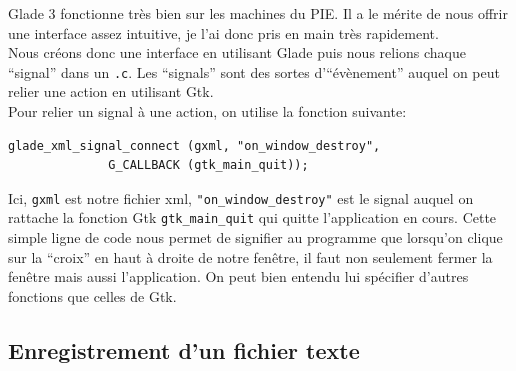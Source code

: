 \documentclass[a4paper,12pt]{report}
\begin{document}
Glade 3 fonctionne tr\`es bien sur les machines du PIE. Il a le m\'erite de nous offrir une interface assez intuitive, je l'ai donc pris en main tr\`es rapidement.\\
Nous cr\'eons donc une interface en utilisant Glade puis nous relions chaque ``signal'' dans un \texttt{.c}. Les ``signals'' sont des sortes d'``\'ev\`enement'' auquel on peut relier une action en utilisant Gtk.\\
Pour relier un signal \`a une action, on utilise la fonction suivante:

\begin{lstlisting}
glade_xml_signal_connect (gxml, "on_window_destroy",
			  G_CALLBACK (gtk_main_quit));
\end{lstlisting}

Ici, \verb!gxml! est notre fichier xml, \verb!"on_window_destroy"! est le signal auquel on rattache la fonction Gtk \verb!gtk_main_quit! qui quitte l'application en cours. Cette simple ligne de code nous permet de signifier au programme que lorsqu'on clique sur la ``croix'' en haut \`a droite de notre fen\^etre, il faut non seulement fermer la fen\^etre mais aussi l'application.
On peut bien entendu lui sp\'ecifier d'autres fonctions que celles de Gtk.

\subsection{Enregistrement d'un fichier texte} %
\label{sec:enregistrement_d_un_fichier_texte}
\end{document}
